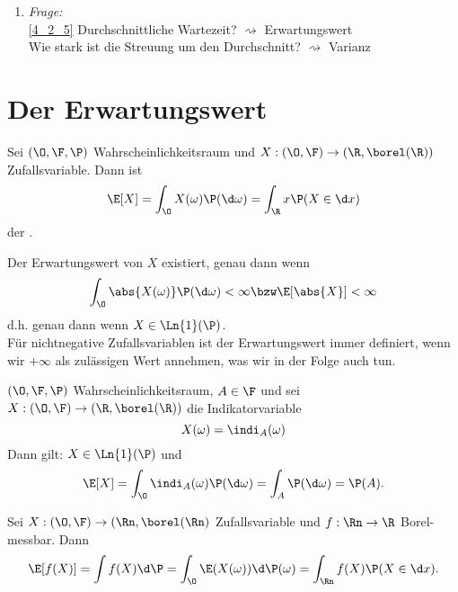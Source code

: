 ﻿\begin{enumerate}
	\item \emph{Frage:} \\
	\cref{4_2_5} Durchschnittliche Wartezeit? $\rightsquigarrow$ Erwartungswert\\
	Wie stark ist die Streuung um den Durchschnitt? $\rightsquigarrow$ Varianz
\end{enumerate}
\section{Der Erwartungswert}
\begin{definition}[Erwartungswert]
	Sei $(\O, \F, \P)$ Wahrscheinlichkeitsraum und $X: (\O, \F) \to (\R, \borel(\R))$ Zufallsvariable. Dann ist
	\begin{align*}
		\E[X] = \int_{\O} X(\omega) \P(\d \omega) = \int_{\R} x \P(X  \in \d x)
	\end{align*}
	der .
\end{definition}
\begin{*hint}
	Der Erwartungswert von $X$ existiert, genau dann wenn
	\begin{align*}
		\int_{\O} \abs{X(\omega)}\P(\d \omega) < \infty \bzw \E[\abs{X}] < \infty
	\end{align*}
	d.h. genau dann wenn $X \in \Ln{1} (\P)$.\\
	Für nichtnegative Zufallsvariablen ist der Erwartungswert immer definiert, wenn wir $+\infty$ als zulässigen Wert annehmen, was wir in der Folge auch tun.
\end{*hint}
\begin{example}
	$(\O, \F, \P)$ Wahrscheinlichkeitsraum, $A \in \F$ und sei $X: (\O, \F) \to (\R, \borel(\R))$ die Indikatorvariable %
	\[
		X(\omega) = \indi_{A} (\omega)
	\]
	Dann gilt: $X \in \Ln{1}(\P)$ und
	\begin{align*}
		\E[X] = \int_{\O} \indi_{A} (\omega) \P(\d \omega) = \int_{A} \P(\d \omega) = \P(A).
	\end{align*}
\end{example}
\begin{proposition}
	Sei $X: (\O, \F) \to (\Rn, \borel(\Rn)$ Zufallsvariable und $f: \Rn \to \R$ Borel-messbar. Dann
	\begin{align*}
		\E[f(X)] = \int f(X)\d \P = \int_{\O} \E(X(\omega)) \d \P(\omega) = \int_{\Rn} f(X) \P(X \in \d x). 
	\end{align*}
\end{proposition}
